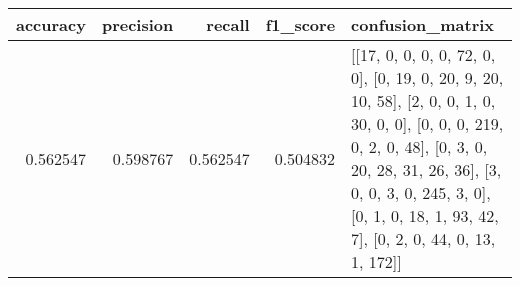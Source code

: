 \begin{tabular}{rrrrl}
\toprule
accuracy & precision & recall & f1_score & confusion_matrix \\
\midrule
0.562547 & 0.598767 & 0.562547 & 0.504832 & [[17, 0, 0, 0, 0, 72, 0, 0], [0, 19, 0, 20, 9, 20, 10, 58], [2, 0, 0, 1, 0, 30, 0, 0], [0, 0, 0, 219, 0, 2, 0, 48], [0, 3, 0, 20, 28, 31, 26, 36], [3, 0, 0, 3, 0, 245, 3, 0], [0, 1, 0, 18, 1, 93, 42, 7], [0, 2, 0, 44, 0, 13, 1, 172]] \\
\bottomrule
\end{tabular}
